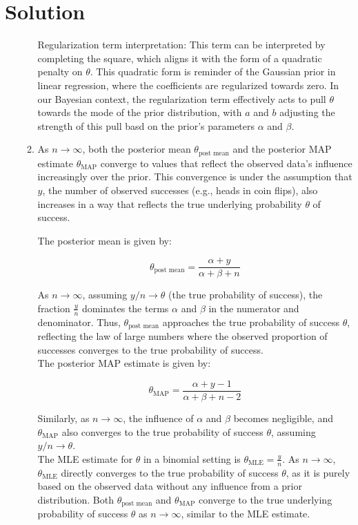 \documentclass[submit]{harvardml}
\newenvironment{answer}
  {\section*{Solution}}
{}
\begin{document}
\begin{answer}
\begin{enumerate}
\begin{enumerate}
              Regularization term interpretation: 
This term can be interpreted by completing the square, which aligns it with the form of a quadratic penalty on \(\theta\). This quadratic form is reminder of the Gaussian prior in linear regression, where the coefficients are regularized towards zero. In our Bayesian context, the regularization term effectively acts to pull \(\theta\) towards the mode of the prior distribution, with \(a\) and \(b\) adjusting the strength of this pull basd on the prior's parameters \(\alpha\) and \(\beta\).

        \item
As \(n \rightarrow \infty\), both the posterior mean \(\theta_{\text{post mean}}\) and the posterior MAP estimate \(\theta_{\text{MAP}}\) converge to values that reflect the observed data's influence increasingly over the prior. This convergence is under the assumption that \(y\), the number of observed successes (e.g., heads in coin flips), also increases in a way that reflects the true underlying probability \(\theta\) of success.

The posterior mean is given by:

\[
\theta_{\text{post mean}} = \frac{\alpha + y}{\alpha + \beta + n}
\]

As \(n \rightarrow \infty\), assuming \(y/n \rightarrow \theta\) (the true probability of success), the fraction \(\frac{y}{n}\) dominates the terms \(\alpha\) and \(\beta\) in the numerator and denominator. Thus, \(\theta_{\text{post mean}}\) approaches the true probability of success \(\theta\), reflecting the law of large numbers where the observed proportion of successes converges to the true probability of success.\\

The posterior MAP estimate is given by:

\[
\theta_{\text{MAP}} = \frac{\alpha + y - 1}{\alpha + \beta + n - 2}
\]

Similarly, as \(n \rightarrow \infty\), the influence of \(\alpha\) and \(\beta\) becomes negligible, and \(\theta_{\text{MAP}}\) also converges to the true probability of success \(\theta\), assuming \(y/n \rightarrow \theta\).\\

The MLE estimate for \(\theta\) in a binomial setting is \(\theta_{\text{MLE}} = \frac{y}{n}\). As \(n \rightarrow \infty\), \(\theta_{\text{MLE}}\) directly converges to the true probability of success \(\theta\), as it is purely based on the observed data without any influence from a prior distribution. Both \(\theta_{\text{post mean}}\) and \(\theta_{\text{MAP}}\) converge to the true underlying probability of success \(\theta\) as \(n \rightarrow \infty\), similar to the MLE estimate.
      \end{enumerate}

  \end{enumerate}
\end{answer}
\end{document}
